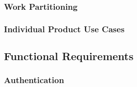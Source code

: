 \documentclass[12pt]{article}
\begin{document}
\subsubsection{Work Partitioning}

\subsubsection{Individual Product Use Cases}

\subsection{Functional Requirements}
\subsubsection{Authentication}
\end{document}
